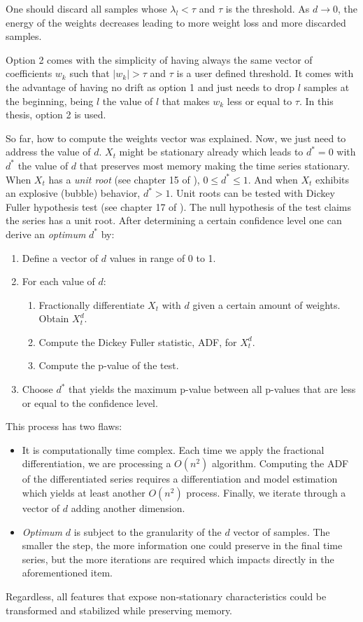 One should discard all samples whose $\lambda_l < \tau$ and $\tau$ is the
threshold. As $d \to 0$, the energy of the weights decreases leading to more
weight loss and more discarded samples.

Option 2 comes with the simplicity of having always the same vector of
coefficients $w_k$ such that $|w_k| > \tau$ and $\tau$ is a user defined
threshold. It comes with the advantage of having no drift as option 1 and just
needs to drop $l$ samples at the beginning, being $l$ the value of $l$ that
makes $w_k$ less or equal to $\tau$. In this thesis, option 2 is used.

So far, how to compute the weights vector was explained. Now, we just need to
address the value of $d$. $X_t$ might be stationary already which leads to
$d^* = 0$ with $d^*$ the value of $d$ that preserves most memory making the 
time series stationary. When $X_t$ has a \emph{unit root} (see chapter 15 of \cite{time_series_analysis}),
$0 \le d^* \leq 1$. And when $X_t$ exhibits an explosive (bubble) behavior,
$d^* > 1$. Unit roots can be tested with Dickey Fuller hypothesis test
(see chapter 17 of \cite{time_series_analysis}). The null hypothesis of the test claims the series has a unit root.
After determining a certain confidence level one can derive an \emph{optimum}
$d^*$ by:

\begin{enumerate}
  \item Define a vector of $d$ values in range of 0 to 1.
  \item For each value of $d$:
  \begin{enumerate}
    \item Fractionally differentiate $X_t$ with $d$ given a certain amount of
          weights. Obtain $X_t^d$.
    \item Compute the Dickey Fuller statistic, ADF, for $X_t^d$.
    \item Compute the p-value of the test.
  \end{enumerate}
  \item Choose $d^*$ that yields the maximum p-value between all p-values that
        are less or equal to the confidence level.
\end{enumerate}

This process has two flaws:

\begin{itemize}
  \item It is computationally time complex. Each time we apply the fractional
        differentiation, we are processing a $O(n^2)$ algorithm. Computing the
        ADF of the differentiated series requires a differentiation and model
        estimation which yields at least another $O(n^2)$ process. Finally, we
        iterate through a vector of $d$ adding another dimension.
  \item \emph{Optimum} $d$ is subject to the granularity of the $d$ vector of
        samples. The smaller the step, the more information one could preserve
        in the final time series, but the more iterations are required which
        impacts directly in the aforementioned item.
\end{itemize}

Regardless, all features that expose non-stationary characteristics could be
transformed and stabilized while preserving memory.
